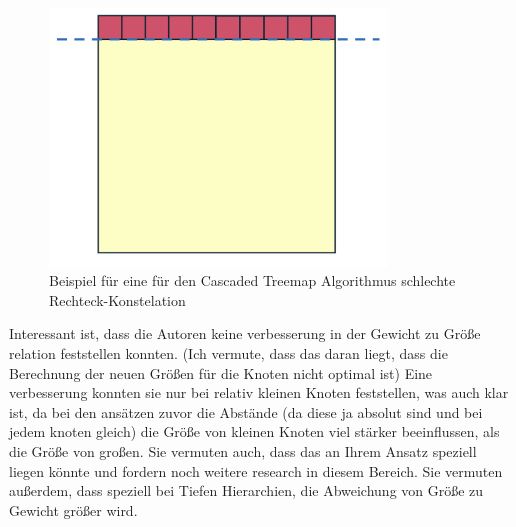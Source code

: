 \begin{figure}
    \centering
    \includegraphics[width=0.8\textwidth]{images/cascadedBadExample.png}
    \caption{Beispiel für eine für den Cascaded Treemap Algorithmus schlechte Rechteck-Konstelation}
    \label{fig:cascadedBadExample}
\end{figure}

Interessant ist, dass die Autoren keine verbesserung in der Gewicht zu Größe relation feststellen konnten. (Ich vermute, dass das daran liegt, dass die Berechnung der neuen Größen für die Knoten nicht optimal ist) 
Eine verbesserung konnten sie nur bei relativ kleinen Knoten feststellen, was auch klar ist, da bei den ansätzen zuvor die Abstände (da diese ja absolut sind und bei jedem knoten gleich) die Größe von kleinen Knoten viel stärker beeinflussen, als die Größe von großen. Sie vermuten auch, dass das an Ihrem Ansatz speziell liegen könnte und fordern noch weitere research in diesem Bereich.
Sie vermuten außerdem, dass speziell bei Tiefen Hierarchien, die Abweichung von Größe zu Gewicht größer wird.  





